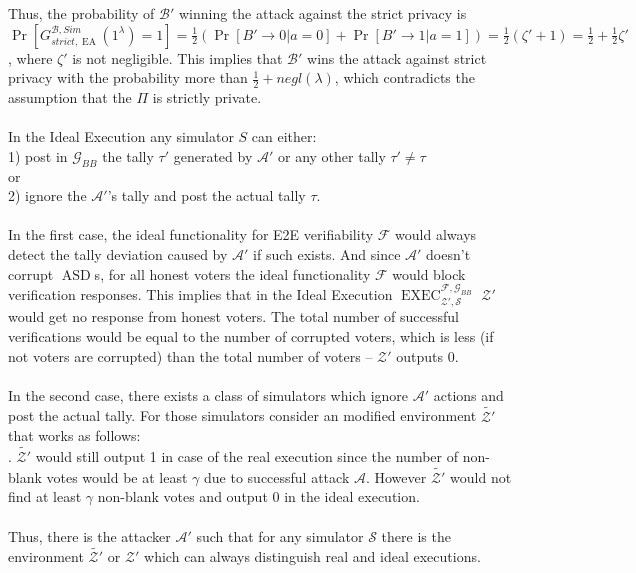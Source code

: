 \documentclass[12pt]{article}
\DeclareMathOperator{\exec}{EXEC}
\DeclareMathOperator{\asd}{ASD}
\DeclareMathOperator{\ea}{EA}
\begin{document}
%
Thus, the probability of $\mathcal{B'}$  winning the attack against the strict privacy is \\$\Pr[G_{strict,\ea}^{\mathcal{B}, Sim}(1^{\lambda})=1]= \frac{1}{2}(\Pr[B'\rightarrow 0| a=0] + \Pr[B'\rightarrow 1| a=1])  = \frac{1}{2} (\zeta' +1) =  \frac{1}{2}  +  \frac{1}{2} \zeta'$ , where $\zeta'$ is not negligible. This implies that $\mathcal{B'}$ wins the attack against strict privacy with the probability more than $\frac{1}{2} + negl(\lambda)$, which contradicts the assumption that the $\Pi$ is strictly private.\\\\
In the Ideal Execution any simulator $S$ can either:\\
1) post in $\mathcal{G}_{BB}$ the tally $\tau'$ generated by $\mathcal{A'}$ or any other tally  $\tau' \neq \tau$\\ 
or\\
2) ignore the $\mathcal{A'}$'s tally and post the actual tally $\tau$.\\\\
In the first case, the ideal functionality for E2E verifiability  $\mathcal{F}$  would always detect the tally deviation caused by $\mathcal{A'}$ if such exists. And since  $\mathcal{A'}$ doesn't corrupt $\asd$s, for all honest voters the ideal functionality $\mathcal{F}$ would block verification responses. This implies that in the Ideal Execution $\exec_{\mathcal{Z'}, \mathcal{S}}^{\mathcal{F}, \mathcal{G}_{BB}}$ $\mathcal{Z'}$ would get no response from honest voters. The total number of successful verifications would be equal to the number of corrupted voters, which is less (if not voters are corrupted) than the total number of voters -- $\mathcal{Z'}$ outputs 0.  \\\\
In the second case, there exists a class of simulators which ignore $\mathcal{A'}$ actions and post the actual tally.  For those simulators consider an modified  environment $\tilde{\mathcal{Z'}}$ that works as follows:\\
.
$\tilde{\mathcal{Z'}}$ would still output 1 in case of the real execution since the number of non-blank votes would be at least $\gamma$ due to successful attack  $\mathcal{A}$. However  $\tilde{\mathcal{Z'}}$ would not find at least $\gamma$ non-blank votes and output 0 in the ideal execution. \\\\
Thus, there is the attacker $\mathcal{A'}$ such that for any simulator $\mathcal{S}$ there is the environment $\tilde{\mathcal{Z'}}$ or $\mathcal{Z'}$ which can always distinguish real and ideal executions. 
\end{document}
